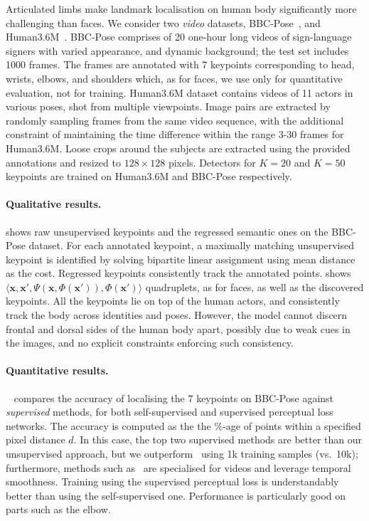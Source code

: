 \documentclass{article}
\newcommand{\bx}{\mathbf{x}}
\begin{document}
Articulated limbs make landmark localisation on human body significantly more challenging than faces. We consider two \emph{video} datasets, BBC-Pose~\cite{Charles13}, and Human3.6M~\citep{h36m_pami}. BBC-Pose comprises of 20 one-hour long videos of sign-language signers with varied appearance, and dynamic background;
the test set includes 1000 frames. The frames are annotated with 7 keypoints corresponding to head, wrists, elbows, and shoulders which, as for faces, we use only for quantitative evaluation, not for training. Human3.6M dataset contains videos of 11 actors in various poses, shot from multiple viewpoints.
Image pairs are extracted by randomly sampling frames from the same video sequence, with the additional constraint of maintaining the time difference within the range 3-30 frames for Human3.6M. Loose crops around the subjects are extracted using the provided annotations and resized to $128{\times}128$ pixels.
Detectors for $K=20$ and $K=50$ keypoints are trained on Human3.6M and BBC-Pose respectively.

\paragraph{Qualitative results.} shows raw unsupervised keypoints and the regressed semantic ones on the BBC-Pose dataset. For each annotated keypoint, a maximally matching unsupervised keypoint is identified by solving bipartite linear assignment using mean distance as the cost. Regressed keypoints consistently track the annotated points.  shows $\langle\bx,\bx',\Psi\left(\bx,\Phi(\bx')\right),\Phi(\bx')\rangle$ quadruplets, as for faces, as well as the discovered keypoints. All the keypoints lie on top of the human actors, and consistently track the body across identities and poses. However, the model cannot discern frontal and dorsal sides of the human body apart, possibly due to weak cues in the images, and no explicit constraints enforcing such consistency.
\paragraph{Quantitative results.}~ compares the accuracy of localising the 7 keypoints on BBC-Pose against \emph{supervised} methods, for both self-supervised and supervised perceptual loss networks. The accuracy is computed as the the $\%$-age of points within a specified pixel distance $d$. In this case, the top two supervised methods are better than our unsupervised approach, but we outperform~\cite{Pfister13,Yang11} using 1k training samples (vs.~10k); furthermore, methods such as~\cite{Pfister15a} are specialised for videos and leverage temporal smoothness. Training using the supervised perceptual loss is understandably better than using the self-supervised one. Performance is particularly good on parts such as the elbow.
\end{document}
